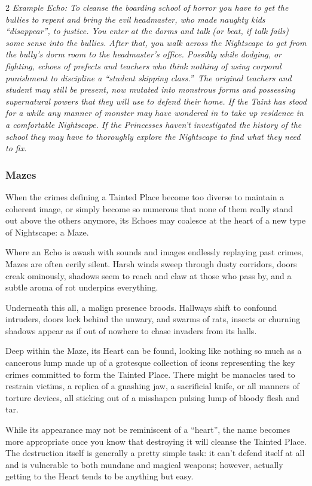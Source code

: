 \begin{multicols}{2}
\textit{Example Echo: To cleanse the boarding school of horror you have to get the bullies to repent and bring the evil headmaster, who made naughty kids “disappear”, to justice. You enter at the dorms and talk (or beat, if talk fails) some sense into the bullies. After that, you walk across the Nightscape to get from the bully's dorm room to the headmaster's office. Possibly while dodging, or fighting, echoes of prefects and teachers who think nothing of using corporal punishment to discipline a \textquotedblleft student skipping class.\textquotedblright\, The original teachers and student may still be present, now mutated into monstrous forms and possessing supernatural powers that they will use to defend their home. If the Taint has stood for a while any manner of monster may have wondered in to take up residence in a comfortable Nightscape. If the Princesses haven’t investigated the history of the school they may have to thoroughly explore the Nightscape to find what they need to fix.}

\subsubsection*{Mazes}

When the crimes defining a Tainted Place become too diverse to maintain a coherent image, or simply become so numerous that none of them really stand out above the others anymore, its Echoes may coalesce at the heart of a new type of Nightscape: a Maze.

Where an Echo is awash with sounds and images endlessly replaying past crimes, Mazes are often eerily silent. Harsh winds sweep through dusty corridors, doors creak ominously, shadows seem to reach and claw at those who pass by, and a subtle aroma of rot underpins everything.

Underneath this all, a malign presence broods. Hallways shift to confound intruders, doors lock behind the unwary, and swarms of rats, insects or churning shadows appear as if out of nowhere to chase invaders from its halls.

Deep within the Maze, its Heart can be found, looking like nothing so much as a cancerous lump made up of a grotesque collection of icons representing the key crimes committed to form the Tainted Place. There might be manacles used to restrain victims, a replica of a gnashing jaw, a sacrificial knife, or all manners of torture devices, all sticking out of a misshapen pulsing lump of bloody flesh and tar. 

While its appearance may not be reminiscent of a \textquotedblleft heart\textquotedblright, the name becomes more appropriate once you know that destroying it will cleanse the Tainted Place. The destruction itself is generally a pretty simple task: it can't defend itself at all and is vulnerable to both mundane and magical weapons; however, actually getting to the Heart tends to be anything but easy.


\end{multicols}
